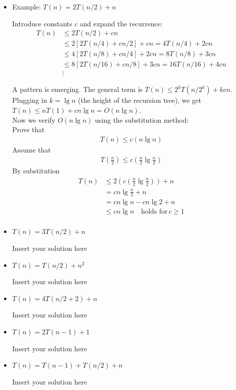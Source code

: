 \documentclass[a4paper]{article}
\begin{document}
\begin{itemize}

\item Example: $T(n) = 2T(n/2) + n$

Introduce constants $c$ and expand the recurrence: \\
\begin{align*}
T(n) & \leq 2T(n/2) + cn \\
~ & \leq 2[2T(n/4) + cn/2] + cn = 4T(n/4)+2cn \\
~ & \leq 4[2T(n/8) + cn/4] + 2cn = 8T(n/8)+3cn \\
~ & \leq 8[2T(n/16) + cn/8] + 3cn = 16T(n/16)+4cn \\
~ & \vdots
\end{align*}

A pattern is emerging. The general term is $T(n) \leq 2^k T(n/2^k) + kcn$. Plugging in $k=\lg n$ (the height of the recursion tree), we get $T(n) \leq nT(1) + cn \lg n = O(n \lg n)$.\\
\newline
Now we verify $O(n \lg n)$ using the substitution method:\\
\newline
Prove that
\begin{align*}
T(n) \leq c(n \lg n)
\end{align*}
Assume that
\begin{align*}
T(\frac{n}{2}) \leq c(\frac{n}{2} \lg \frac{n}{2})
\end{align*}
By substitution
\begin{align*}
T(n) & \leq 2(c(\frac{n}{2} \lg \frac{n}{2})) +  n \\
~ & = cn \lg \frac{n}{2} + n \\
~ & = cn \lg n - cn \lg 2 + n \\
~ & \leq cn \lg n \quad \text{holds for} \, c \geq 1 \\
\end{align*}

\item $T(n) = 3T(n/2) + n$ 

Insert your solution here

\item $T(n) = T(n/2) + n^2$

Insert your solution here

\item $T(n) = 4T(n/2 + 2) + n$

Insert your solution here

\item $T(n) = 2T(n-1) + 1$

Insert your solution here

\item $T(n) = T(n-1) + T(n/2) + n$

Insert your solution here

\end{itemize}
\end{document}
